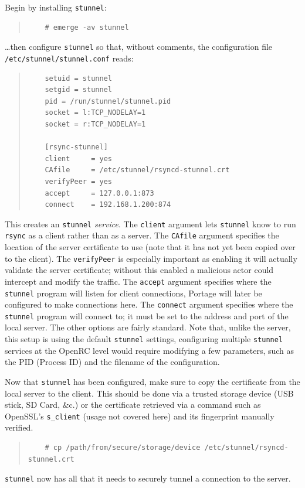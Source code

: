 \documentclass{article}
\begin{document}
Begin by installing \texttt{stunnel}:
\begin{quote}
\begin{verbatim}
	# emerge -av stunnel
\end{verbatim}
\end{quote}
\ldots then configure \texttt{stunnel} so that, without comments, the configuration file \texttt{/etc/stunnel/stunnel.conf} reads:
\begin{quote}
\begin{verbatim}
	setuid = stunnel
	setgid = stunnel
	pid = /run/stunnel/stunnel.pid
	socket = l:TCP_NODELAY=1
	socket = r:TCP_NODELAY=1

	[rsync-stunnel]
	client     = yes
	CAfile     = /etc/stunnel/rsyncd-stunnel.crt
	verifyPeer = yes
	accept     = 127.0.0.1:873
	connect    = 192.168.1.200:874
\end{verbatim}
\end{quote}
This creates an \texttt{stunnel} \emph{service}.  The \texttt{client} argument lets \texttt{stunnel} know to run \texttt{rsync} as a client rather than as a server.  The \texttt{CAfile} argument specifies the location of the server certificate to use (note that it has not yet been copied over to the client).  The \texttt{verifyPeer} is especially important as enabling it will actually validate the server certificate; without this enabled a malicious actor could intercept and modify the traffic.  The \texttt{accept} argument specifies where the \texttt{stunnel} program will listen for client connections, Portage will later be configured to make connections here.  The \texttt{connect} argument specifies where the \texttt{stunnel} program will connect to; it must be set to the address and port of the local server.  The other options are fairly standard.  Note that, unlike the server, this setup is using the default \texttt{stunnel} settings, configuring multiple \texttt{stunnel} services at the OpenRC level would require modifying a few parameters, such as the PID (Process ID) and the filename of the configuration.

Now that \texttt{stunnel} has been configured, make sure to copy the certificate from the local server to the client.  This should be done via a trusted storage device (USB stick, SD Card, \&c.) or the certificate retrieved via a command such as OpenSSL's \texttt{s\_client} (usage not covered here) and its fingerprint manually verified.
\begin{quote}
\begin{verbatim}
	# cp /path/from/secure/storage/device /etc/stunnel/rsyncd-stunnel.crt
\end{verbatim}
\end{quote}
\texttt{stunnel} now has all that it needs to securely tunnel a connection to the server.
\end{document}

